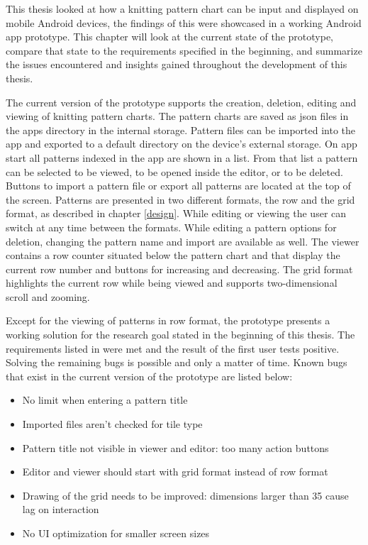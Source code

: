 This thesis looked at how a knitting pattern chart can be input and displayed on mobile Android devices, the findings of this were showcased in a working Android app prototype. This chapter will look at the current state of the prototype, compare that state to the requirements specified in the beginning, and summarize the issues encountered and insights gained throughout the development of this thesis.

The current version of the prototype supports the creation, deletion, editing and viewing of knitting pattern charts. The pattern charts are saved as \gls{json} files in the apps directory in the internal storage. Pattern files can be imported into the app and exported to a default directory on the device's external storage. On app start all patterns indexed in the app are shown in a list. From that list a pattern can be selected to be viewed, to be opened inside the editor, or to be deleted. Buttons to import a pattern file or export all patterns are located at the top of the screen. Patterns are presented in two different formats, the row and the grid format, as described in chapter \ref{design}. While editing or viewing the user can switch at any time between the formats. While editing a pattern options for deletion, changing the pattern name and import are available as well. The viewer contains a row counter situated below the pattern chart and that display the current row number and buttons for increasing and decreasing. The grid format highlights the current row while being viewed and supports two-dimensional scroll and zooming.

Except for the viewing of patterns in row format, the prototype presents a working solution for the research goal stated in the beginning of this thesis. The requirements listed in  were met and the result of the first user tests positive. Solving the remaining bugs is possible and only a matter of time. Known bugs that exist in the current version of the prototype are listed below:

\begin{itemize}
\item No limit when entering a pattern title
\item Imported files aren't checked for tile type
\item Pattern title not visible in viewer and editor: too many action buttons
\item Editor and viewer should start with grid format instead of row format
\item Drawing of the grid needs to be improved: dimensions larger than 35 cause lag on interaction
\item No \gls{UI} optimization for smaller screen sizes
\end{itemize}

